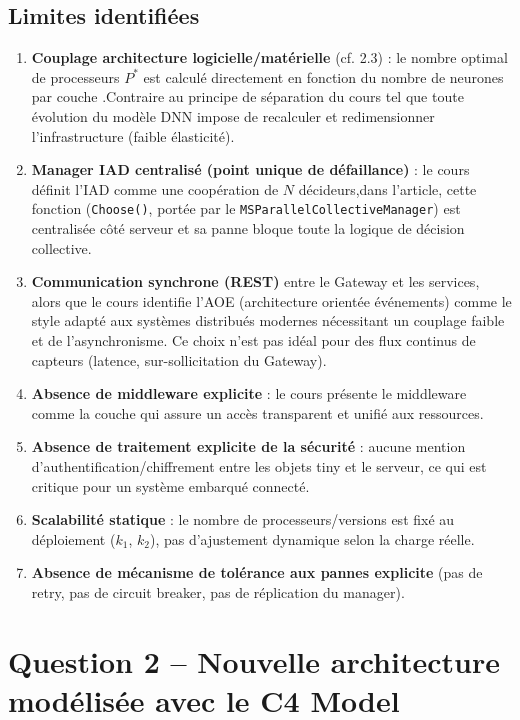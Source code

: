 \documentclass[11pt,a4paper]{article}
\begin{document}
\subsection{Limites identifiées}
\begin{enumerate}
\item \textbf{Couplage architecture logicielle/matérielle} (cf. 2.3) : le nombre optimal de processeurs $P^{*}$ est calculé directement en fonction du nombre de neurones par couche .Contraire au principe de séparation du cours tel que toute évolution du modèle DNN impose de recalculer et redimensionner l'infrastructure (faible élasticité).
\item \textbf{Manager IAD centralisé (point unique de défaillance)} : le cours définit l'IAD comme une coopération de $N$ décideurs,dans l'article, cette fonction (\texttt{Choose()}, portée par le \texttt{MSParallelCollectiveManager}) est centralisée côté serveur et sa panne bloque toute la logique de décision collective.
\item \textbf{Communication synchrone (REST)} entre le Gateway et les services, alors que le cours identifie l'AOE (architecture orientée événements) comme le style adapté aux systèmes distribués modernes nécessitant un couplage faible et de l'asynchronisme. Ce choix n'est pas idéal pour des flux continus de capteurs (latence, sur-sollicitation du Gateway).
\item \textbf{Absence de middleware explicite} : le cours présente le middleware comme la couche qui assure un accès transparent et unifié aux ressources.
\item \textbf{Absence de traitement explicite de la sécurité} : aucune mention d'authentification/chiffrement entre les objets tiny et le serveur, ce qui est critique pour un système embarqué connecté.
\item \textbf{Scalabilité statique} : le nombre de processeurs/versions est fixé au déploiement ($k_1$, $k_2$), pas d'ajustement dynamique selon la charge réelle.
\item \textbf{Absence de mécanisme de tolérance aux pannes explicite} (pas de retry, pas de circuit breaker, pas de réplication du manager).
\end{enumerate}

\newpage
\section{Question 2 -- Nouvelle architecture modélisée avec le C4 Model}
\end{document}
